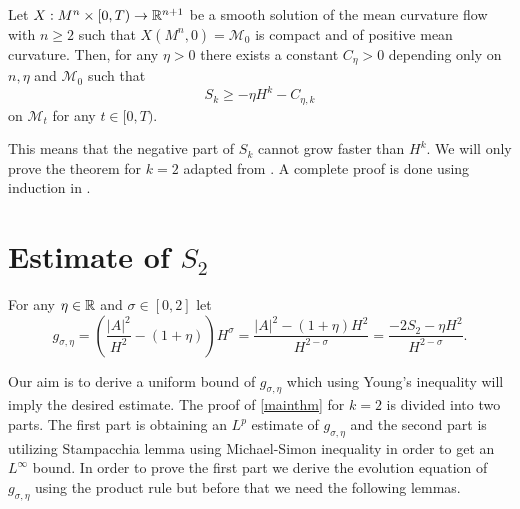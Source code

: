 \begin{thm}\label{mainthm}
    Let $ X : M^{n} \times [0,T) \to \mathbb{R}^{n+1}$ be a smooth solution of the mean curvature flow with $ n \ge 2 $ such that $ X(M^{n}, 0) = \mathcal{M}_{0} $ is compact and of positive mean curvature. Then, for any $ \eta >0 $ there exists a constant $ C_{\eta} >0 $ depending only on $ n, \eta $ and $ \mathcal{M}_{0} $ such that 
    \begin{equation}
        S_{k} \ge - \eta H^{k} - C_{\eta,k}
    \end{equation}
    on $ \mathcal{M}_{t} $ for any $ t \in [0,T) $.
\end{thm}

This means that the negative part of $ S_{k} $ cannot grow faster than $ H^{k} $. We will only prove the theorem for $ k=2 $ adapted from \cite{huisken1999mean}. A complete proof is done using induction in \cite{huisken1999convexity}. 
\section{Estimate of $S_{2}$}
For any $ \eta \in \mathbb{R} $ and $ \sigma \in [0,2] $ let 
$$ g_{\sigma,\eta} = \left( \frac{|A|^{2}}{H^{2}}- (1+ \eta) \right)H^{\sigma} = \frac{|A|^{2}-(1+\eta)H^{2}}{H^{2-\sigma}} = \frac{-2S_{2}- \eta H^{2}}{H^{2-\sigma}}.$$

Our aim is to derive a uniform bound of $ g_{\sigma,\eta} $ which using Young's inequality will imply the desired estimate. The proof of \cref{mainthm} for $ k=2 $ is divided into two parts. The first part is obtaining an $ L^{p} $ estimate of $ g_{ \sigma, \eta} $ and the second part is utilizing Stampacchia lemma using Michael-Simon inequality in order to get an $ L^{\infty} $ bound. In order to prove the first part we derive the evolution equation of $ g_{\sigma,\eta} $ using the product rule but before that we need the following lemmas. 

